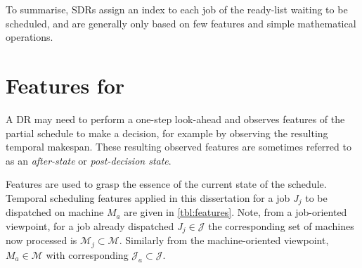 
To summarise, SDRs assign an index to each job of the ready-list waiting to be scheduled, and are generally only based on few features and simple mathematical operations. 


\section{Features for \jsp}\label{sec:features}
A DR may need to perform a one-step look-ahead and observes features of the partial schedule to make a decision, for example by observing the resulting temporal makespan. These resulting observed features are sometimes referred to as an \emph{after-state} or \emph{post-decision state}. 

Features are used to grasp the essence of the current state of the schedule. Temporal scheduling features applied in this dissertation for a job $J_j$ to be dispatched on machine $M_a$ are given in \cref{tbl:features}. 
Note, from a job-oriented viewpoint, for a job already dispatched $J_j\in\mathcal{J}$ the corresponding set of machines now processed is $\mathcal{M}_j\subset\mathcal{M}$. Similarly from the machine-oriented viewpoint, $M_a\in\mathcal{M}$ with corresponding $\mathcal{J}_a\subset\mathcal{J}$. 

